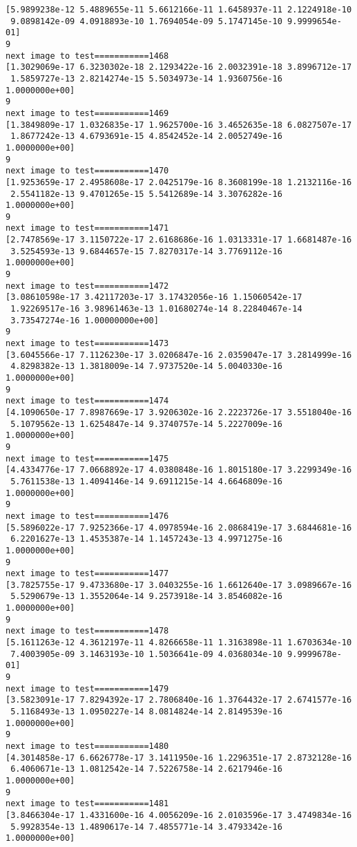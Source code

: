 \documentclass[11pt]{article}
\begin{document}
\begin{Verbatim}[commandchars=\\\{\}]
[5.9899238e-12 5.4889655e-11 5.6612166e-11 1.6458937e-11 2.1224918e-10
 9.0898142e-09 4.0918893e-10 1.7694054e-09 5.1747145e-10 9.9999654e-01]
9
next image to test===========1468
[1.3029069e-17 6.3230302e-18 2.1293422e-16 2.0032391e-18 3.8996712e-17
 1.5859727e-13 2.8214274e-15 5.5034973e-14 1.9360756e-16 1.0000000e+00]
9
next image to test===========1469
[1.3849809e-17 1.0326835e-17 1.9625700e-16 3.4652635e-18 6.0827507e-17
 1.8677242e-13 4.6793691e-15 4.8542452e-14 2.0052749e-16 1.0000000e+00]
9
next image to test===========1470
[1.9253659e-17 2.4958608e-17 2.0425179e-16 8.3608199e-18 1.2132116e-16
 2.5541182e-13 9.4701265e-15 5.5412689e-14 3.3076282e-16 1.0000000e+00]
9
next image to test===========1471
[2.7478569e-17 3.1150722e-17 2.6168686e-16 1.0313331e-17 1.6681487e-16
 3.5254593e-13 9.6844657e-15 7.8270317e-14 3.7769112e-16 1.0000000e+00]
9
next image to test===========1472
[3.08610598e-17 3.42117203e-17 3.17432056e-16 1.15060542e-17
 1.92269517e-16 3.98961463e-13 1.01680274e-14 8.22840467e-14
 3.73547274e-16 1.00000000e+00]
9
next image to test===========1473
[3.6045566e-17 7.1126230e-17 3.0206847e-16 2.0359047e-17 3.2814999e-16
 4.8298382e-13 1.3818009e-14 7.9737520e-14 5.0040330e-16 1.0000000e+00]
9
next image to test===========1474
[4.1090650e-17 7.8987669e-17 3.9206302e-16 2.2223726e-17 3.5518040e-16
 5.1079562e-13 1.6254847e-14 9.3740757e-14 5.2227009e-16 1.0000000e+00]
9
next image to test===========1475
[4.4334776e-17 7.0668892e-17 4.0380848e-16 1.8015180e-17 3.2299349e-16
 5.7611538e-13 1.4094146e-14 9.6911215e-14 4.6646809e-16 1.0000000e+00]
9
next image to test===========1476
[5.5896022e-17 7.9252366e-17 4.0978594e-16 2.0868419e-17 3.6844681e-16
 6.2201627e-13 1.4535387e-14 1.1457243e-13 4.9971275e-16 1.0000000e+00]
9
next image to test===========1477
[3.7825755e-17 9.4733680e-17 3.0403255e-16 1.6612640e-17 3.0989667e-16
 5.5290679e-13 1.3552064e-14 9.2573918e-14 3.8546082e-16 1.0000000e+00]
9
next image to test===========1478
[5.1611263e-12 4.3612197e-11 4.8266658e-11 1.3163898e-11 1.6703634e-10
 7.4003905e-09 3.1463193e-10 1.5036641e-09 4.0368034e-10 9.9999678e-01]
9
next image to test===========1479
[3.5823091e-17 7.8294392e-17 2.7806840e-16 1.3764432e-17 2.6741577e-16
 5.1168493e-13 1.0950227e-14 8.0814824e-14 2.8149539e-16 1.0000000e+00]
9
next image to test===========1480
[4.3014858e-17 6.6626778e-17 3.1411950e-16 1.2296351e-17 2.8732128e-16
 6.4060671e-13 1.0812542e-14 7.5226758e-14 2.6217946e-16 1.0000000e+00]
9
next image to test===========1481
[3.8466304e-17 1.4331600e-16 4.0056209e-16 2.0103596e-17 3.4749834e-16
 5.9928354e-13 1.4890617e-14 7.4855771e-14 3.4793342e-16 1.0000000e+00]

\end{Verbatim}
\end{document}
